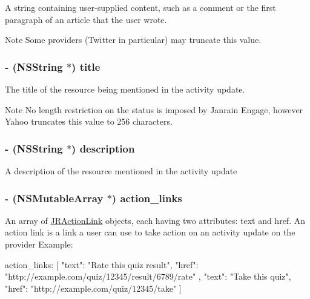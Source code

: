\label{interface_j_r_activity_object_a965d03730324bcda4374450ad648505b}
A string containing user-\/supplied content, such as a comment or the first paragraph of an article that the user wrote.

\begin{DoxyNote}{Note}
Some providers (Twitter in particular) may truncate this value. 
\end{DoxyNote}
\hypertarget{interface_j_r_activity_object_ae64ba976e73c3926a04c46ba0aeba583}{
\subsubsection[{title}]{\setlength{\rightskip}{0pt plus 5cm}-\/ (NSString $\ast$) title}}
\label{interface_j_r_activity_object_ae64ba976e73c3926a04c46ba0aeba583}
The title of the resource being mentioned in the activity update.

\begin{DoxyNote}{Note}
No length restriction on the status is imposed by Janrain Engage, however Yahoo truncates this value to 256 characters. 
\end{DoxyNote}
\hypertarget{interface_j_r_activity_object_a35d4fcb4e1aaa9d6325333228104604f}{
\subsubsection[{description}]{\setlength{\rightskip}{0pt plus 5cm}-\/ (NSString $\ast$) description}}
\label{interface_j_r_activity_object_a35d4fcb4e1aaa9d6325333228104604f}
A description of the resource mentioned in the activity update \hypertarget{interface_j_r_activity_object_aa5c629e1c3b8306b2532ab647f7f6ec5}{
\subsubsection[{action\_\-links}]{\setlength{\rightskip}{0pt plus 5cm}-\/ (NSMutableArray $\ast$) action\_\-links}}
\label{interface_j_r_activity_object_aa5c629e1c3b8306b2532ab647f7f6ec5}
An array of {\ttfamily \hyperlink{interface_j_r_action_link}{JRActionLink}} objects, each having two attributes: text and href. An action link is a link a user can use to take action on an activity update on the provider Example: 
\begin{DoxyCode}
 action_links: 
 [
   {
     "text": "Rate this quiz result",
     "href": "http://example.com/quiz/12345/result/6789/rate"
   },
   {
     "text": "Take this quiz",
     "href": "http://example.com/quiz/12345/take"
   }
 ]
\end{DoxyCode}



